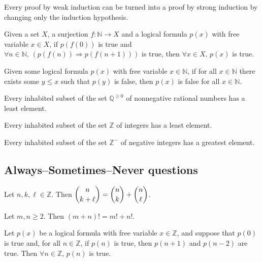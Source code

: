 \begin{chapex} %
Every proof by weak induction can be turned into a proof by strong induction by changing only the induction hypothesis.
\end{chapex}

\begin{chapex} %
Given a set $X$, a surjection $f : \mathbb{N} \to X$ and a logical formula $p(x)$ with free variable $x \in X$, if $p(f(0))$ is true and $\forall n \in \mathbb{N},\, (p(f(n)) \Rightarrow p(f(n+1)))$ is true, then $\forall x \in X,\, p(x)$ is true.
\end{chapex}

\begin{chapex} %
Given some logical formula $p(x)$ with free variable $x \in \mathbb{N}$, if for all $x \in \mathbb{N}$ there exists some $y \le x$ such that $p(y)$ is false, then $p(x)$ is false for all $x \in \mathbb{N}$.
\end{chapex}

\begin{chapex} %
Every inhabited subset of the set $\mathbb{Q}^{\ge 0}$ of nonnegative rational numbers has a least element. 
\end{chapex}

\begin{chapex} %
Every inhabited subset of the set $\mathbb{Z}$ of integers has a least element.
\end{chapex}

\begin{chapex} %
\label{cqInductionTFEnd}
Every inhabited subset of the set $\mathbb{Z}^{-}$ of negative integers has a greatest element.
\end{chapex}

\subsection*{Always--Sometimes--Never questions}


\begin{chapex} %
\label{cqInductionASNBegin}
Let $n,k,\ell \in \mathbb{Z}$. Then $\dbinom{n}{k+\ell} = \dbinom{n}{k} + \dbinom{n}{\ell}$.
\end{chapex}

\begin{chapex} %
Let $m,n \ge 2$. Then $(m+n)! = m!+n!$.
\end{chapex}

\begin{chapex} %
\label{cqInductionASNEnd}
Let $p(x)$ be a logical formula with free variable $x \in \mathbb{Z}$, and suppose that $p(0)$ is true and, for all $n \in \mathbb{Z}$, if $p(n)$ is true, then $p(n+1)$ and $p(n-2)$ are true. Then $\forall n \in \mathbb{Z},\, p(n)$ is true.
\end{chapex}